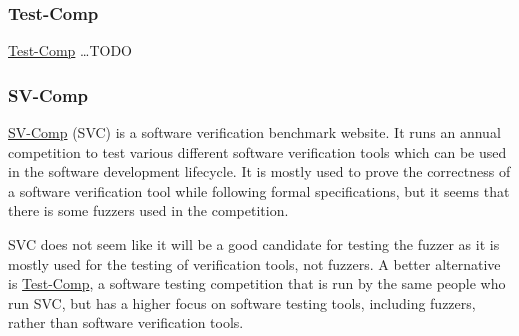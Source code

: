 \documentclass[a4paper,12pt]{article}
\begin{document}
\subsubsection{Test-Comp}
\hyperlink{https://test-comp.sosy-lab.org/2024/}{Test-Comp} \dots TODO

\subsubsection{SV-Comp}
\hyperlink{https://sv-comp.sosy-lab.org/}{SV-Comp} (SVC) is a software verification benchmark website. It runs an annual competition to test various different
software verification tools which can be used in the software development lifecycle. It is mostly used to prove the correctness of a software verification tool
while following formal specifications, but it seems that there is some fuzzers used in the competition.

SVC does not seem like it will be a good candidate for testing the fuzzer as it is mostly used for the testing of verification tools, not fuzzers. A better 
alternative is \hyperlink{https://test-comp.sosy-lab.org/2024/}{Test-Comp}, a software testing competition that is run by the same people who run SVC, but has a 
higher focus on software testing tools, including fuzzers, rather than software verification tools.

\newpage

\printbibliography
\end{document}
